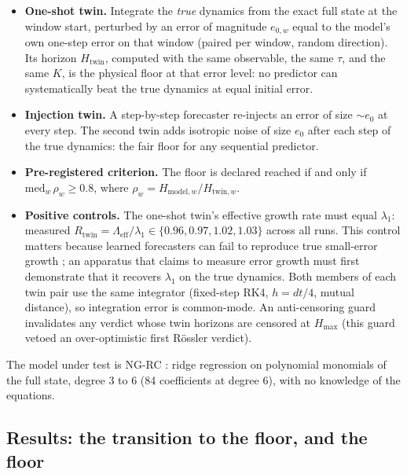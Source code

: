 \documentclass[aps,pre,twocolumn,superscriptaddress,nofootinbib,longbibliography]{revtex4-2}
\newcommand{\Hmax}{H_{\max}}
\newcommand{\eff}{\mathrm{eff}}
\begin{document}
\begin{itemize}
  \item \textbf{One-shot twin.} Integrate the \emph{true} dynamics from
  the exact full state at the window start, perturbed by an error of
  magnitude $e_{0,w}$ equal to the model's own one-step error on that
  window (paired per window, random direction). Its horizon
  $H_{\mathrm{twin}}$, computed with the same observable, the same
  $\tau$, and the same $K$, is the physical floor at that error level: no
  predictor can systematically beat the true dynamics at equal initial
  error.
  \item \textbf{Injection twin.} A step-by-step forecaster re-injects an
  error of size $\sim e_0$ at every step. The second twin adds isotropic
  noise of size $e_0$ after each step of the true dynamics: the fair
  floor for any sequential predictor.
  \item \textbf{Pre-registered criterion.} The floor is declared reached
  if and only if $\mathrm{med}_w\,\rho_w \ge 0.8$, where $\rho_w =
  H_{\mathrm{model},w}/H_{\mathrm{twin},w}$.
  \item \textbf{Positive controls.} The one-shot twin's effective growth
  rate must equal $\lambda_1$: measured $R_{\mathrm{twin}} =
  \Lambda_\eff/\lambda_1 \in \{0.96, 0.97, 1.02, 1.03\}$ across all runs.
  This control matters because learned forecasters can fail to reproduce
  true small-error growth \citep{selz2023butterfly}; an apparatus that
  claims to measure error growth must first demonstrate that it recovers
  $\lambda_1$ on the true dynamics. Both members of each twin pair use
  the same integrator (fixed-step RK4, $h = dt/4$, mutual distance), so
  integration error is common-mode. An anti-censoring guard invalidates
  any verdict whose twin horizons are censored at $\Hmax$ (this guard
  vetoed an over-optimistic first R\"ossler verdict).
\end{itemize}

The model under test is NG-RC \citep{gauthier2021ngrc}: ridge regression
on polynomial monomials of the full state, degree 3 to 6 (84 coefficients
at degree 6), with no knowledge of the equations.

\subsection{Results: the transition to the floor, and the floor}
\end{document}
